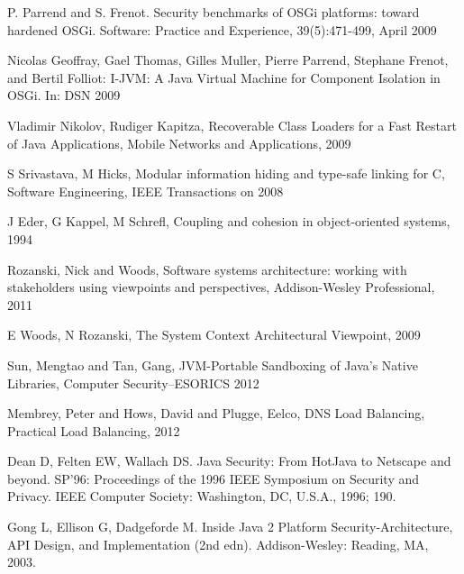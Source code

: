 \begin{thebibliography}{99}
 P. Parrend and S. Frenot. Security benchmarks of OSGi platforms: toward hardened OSGi. Software: Practice and Experience, 39(5):471-499, April 2009

 Nicolas Geoffray, Gael Thomas, Gilles Muller, Pierre Parrend, Stephane Frenot, and Bertil Folliot: I-JVM: A Java Virtual Machine for Component Isolation in OSGi. In: DSN 2009

 Vladimir Nikolov, Rudiger Kapitza, Recoverable Class Loaders for a Fast Restart of Java Applications, Mobile Networks and Applications, 2009

 S Srivastava, M Hicks, Modular information hiding and type-safe linking for C, Software Engineering, IEEE Transactions on 2008

 J Eder, G Kappel, M Schrefl, Coupling and cohesion in object-oriented systems, 1994

 Rozanski, Nick and Woods, Software systems architecture: working with stakeholders using viewpoints and perspectives, Addison-Wesley Professional, 2011

 E Woods, N Rozanski, The System Context Architectural Viewpoint, 2009

 Sun, Mengtao and Tan, Gang, JVM-Portable Sandboxing of Java's Native Libraries, Computer Security--ESORICS 2012

 Membrey, Peter and Hows, David and Plugge, Eelco, DNS Load Balancing, Practical Load Balancing, 2012

 Dean D, Felten EW, Wallach DS. Java Security: From HotJava to Netscape and beyond. SP'96: Proceedings of the 1996 IEEE Symposium on Security and Privacy. IEEE Computer Society: Washington, DC, U.S.A., 1996; 190.

 Gong L, Ellison G, Dadgeforde M. Inside Java 2 Platform Security-Architecture, API Design, and Implementation (2nd edn). Addison-Wesley: Reading, MA, 2003.
 

\end{thebibliography}